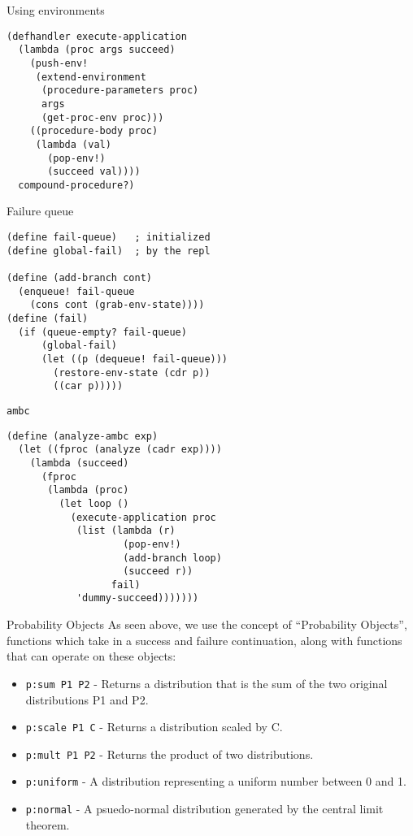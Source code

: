 \documentclass[14pt]{beamer}
\begin{document}
\begin{frame}[fragile]{Using environments}
  \begin{lstlisting}
(defhandler execute-application
  (lambda (proc args succeed)
    (push-env!
     (extend-environment
      (procedure-parameters proc)
      args
      (get-proc-env proc)))
    ((procedure-body proc)
     (lambda (val)
       (pop-env!)
       (succeed val))))
  compound-procedure?)
  \end{lstlisting}
\end{frame}

\begin{frame}[fragile]{Failure queue}
  \begin{lstlisting}
(define fail-queue)   ; initialized
(define global-fail)  ; by the repl

(define (add-branch cont)
  (enqueue! fail-queue
    (cons cont (grab-env-state))))
(define (fail)
  (if (queue-empty? fail-queue)
      (global-fail)
      (let ((p (dequeue! fail-queue)))
        (restore-env-state (cdr p))
        ((car p)))))
  \end{lstlisting}
\end{frame}

\begin{frame}[fragile]{\texttt{ambc}}
  \begin{lstlisting}
(define (analyze-ambc exp)
  (let ((fproc (analyze (cadr exp))))
    (lambda (succeed)
      (fproc
       (lambda (proc)
         (let loop ()
           (execute-application proc
            (list (lambda (r)
                    (pop-env!)
                    (add-branch loop)
                    (succeed r))
                  fail)
            'dummy-succeed)))))))
  \end{lstlisting}
\end{frame}

\begin{frame}{Probability Objects}
  As seen above, we use the concept of ``Probability Objects'', functions which
  take in a success and failure continuation, along with functions that can
  operate on these objects:\\
  \begin{itemize}
    \item \texttt{p:sum P1 P2} - Returns a distribution that is the sum of the
        two original distributions P1 and P2.
    \item \texttt{p:scale P1 C} - Returns a distribution scaled by C.
    \item \texttt{p:mult P1 P2} - Returns the product of two distributions.
    \item \texttt{p:uniform} - A distribution representing a uniform number
      between 0 and 1.
    \item \texttt{p:normal} - A psuedo-normal distribution generated by the
      central limit theorem.
  \end{itemize}
\end{frame}
\end{document}
